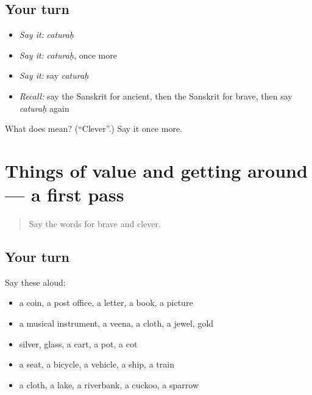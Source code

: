 \subsection*{Your turn}
\begin{itemize}
\raggedright
  \item \emph{Say it:} \emph{caturaḥ}
  \item \emph{Say it:} \emph{caturaḥ}, once more
  \item \emph{Say it:} say \emph{caturaḥ}
  \item \emph{Recall:} say the Sanskrit for ancient, then the Sanskrit for brave, then say \emph{caturaḥ} again
\end{itemize}

\begin{tcolorbox}[breakable,colback=teal!4,colframe=teal!35!black,title={Before you move on}]
What does  mean? (\textquotedblleft{}Clever\textquotedblright{}.) Say it once more.
\end{tcolorbox}
\section[(dialogue)]{Things of value and getting around — a first pass}

\label{lesson:SA-R129-first-pass-things-of-value-and-getting-around}



\begin{quote}
Say the words for brave and clever.
\end{quote}

\subsection*{Your turn}
Say these aloud:

\begin{itemize}
\raggedright
  \item a coin, a post office, a letter, a book, a picture
  \item a musical instrument, a veena, a cloth, a jewel, gold
  \item silver, glass, a cart, a pot, a cot
  \item a seat, a bicycle, a vehicle, a ship, a train
  \item a cloth, a lake, a riverbank, a cuckoo, a sparrow
\end{itemize}

